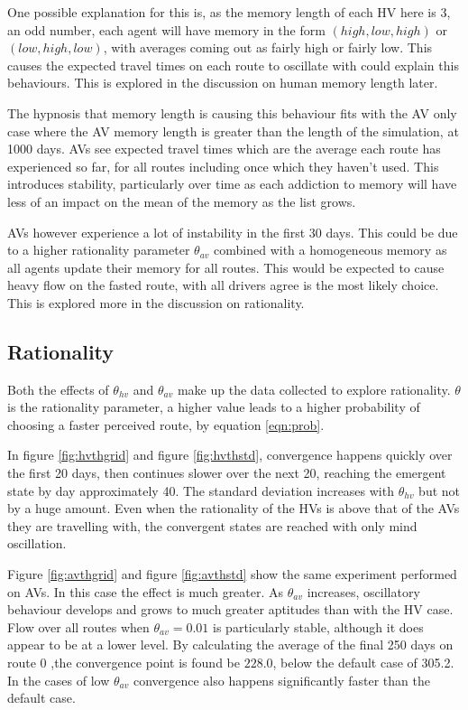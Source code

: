 \documentclass[12pt, a4paper, onecolumn]{article}
\begin{document}
One possible explanation for this is, as the memory length of each HV here is 3, an odd number, each agent will have memory in the form $(high,low,high)$ or $(low,high,low)$, with averages coming out as fairly high or fairly low. This causes the expected travel times on each route to oscillate with could explain this behaviours. This is explored in the discussion on human memory length later.

The hypnosis that memory length is causing this behaviour fits with the AV only case where the AV memory length is greater than the length of the simulation, at 1000 days. AVs see expected travel times which are the average each route has experienced so far, for all routes including once which they haven't used. This introduces stability, particularly over time as each addiction to memory will have less of an impact on the mean of the memory as the list grows. 

AVs however experience a lot of instability in the first 30 days. This could be due to a higher rationality parameter $\theta_{av}$ combined with a homogeneous memory as all agents update their memory for all routes. This would be expected to cause heavy flow on the fasted route, with all drivers agree is the most likely choice. This is explored more in the discussion on rationality. 

\subsection{Rationality}
Both the effects of $\theta_{hv}$ and $\theta_{av}$ make up the data collected to explore rationality. $\theta$ is the rationality parameter, a higher value leads to a higher probability of choosing a faster perceived route, by equation \ref{eqn:prob}.

In figure \ref{fig:hvthgrid} and figure \ref{fig:hvthstd}, convergence happens quickly over the first 20 days, then continues slower over the next 20, reaching the emergent state by day approximately 40. The standard deviation increases with $\theta_{hv}$ but not by a huge amount. Even when the rationality of the HVs is above that of the AVs they are travelling with, the convergent states are reached with only mind oscillation. 

Figure \ref{fig:avthgrid} and figure \ref{fig:avthstd} show the same experiment performed on AVs. In this case the effect is much greater. As $\theta_{av}$ increases, oscillatory behaviour develops and grows to much greater aptitudes than with the HV case. Flow over all routes when $\theta_{av} = 0.01$ is particularly stable, although it does appear to be at a lower level. By calculating the average of the final 250 days on route 0 ,the convergence point is found be $228.0$, below the default case of 305.2. In the cases of low $\theta_{av}$ convergence also happens significantly faster than the default case.
\end{document}

